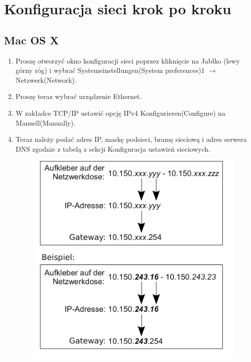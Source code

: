 \documentclass[a4paper,12pt]{scrartcl}
\begin{document}
\section*{Konfiguracja sieci krok po kroku}
\subsection*{Mac OS X}
\begin{enumerate}
    \item Proszę otworzyć okno konfiguracji sieci poprzez kliknięcie na Jabłko (lewy górny róg) i wybrać Systemeinstellungen(System preferences)1 $\rightarrow$ Netzwerk(Network).
    \item Proszę teraz wybrać urządzenie Ethernet.
    \item W zakładce TCP/IP ustawić opcję IPv4 Konfigurieren(Configure) na Manuell(Manually).
    \item Teraz należy podać adres IP, maskę podsieci, bramę sieciową i adres serwera DNS zgodnie z tabelą z sekcji Konfiguracja ustawień sieciowych.
      \begin{figure}[h!]
      \centering
        \begin{minipage}[c]{0.38\linewidth}
          \centering
          \includegraphics[width=\linewidth,keepaspectratio]{Bilder/IP_Gerneric}

\end{minipage}
\end{figure}
\end{enumerate}
\end{document}
